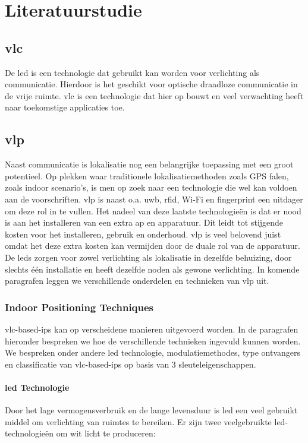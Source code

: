 \chapter{Literatuurstudie}
\section{\acrfull{vlc}}
	De \acrfull{led} is een technologie dat gebruikt kan worden voor verlichting als communicatie. Hierdoor is het geschikt voor optische draadloze communicatie in de vrije ruimte. \gls{vlc} is een technologie dat hier op bouwt en veel verwachting heeft naar toekomstige applicaties toe. 
\section{\acrfull{vlp}}
	Naast communicatie is lokalisatie nog een belangrijke toepassing met een groot potentieel. Op plekken waar traditionele lokalisatiemethoden zoals GPS falen, zoals indoor scenario's, is men op zoek naar een technologie die wel kan voldoen aan de voorschriften. \acrfull{vlp} is naast o.a. \acrfull{uwb}, \acrfull{rfid}, Wi-Fi en fingerprint een uitdager om deze rol in te vullen. Het nadeel van deze laatste technologie\"en is dat er nood is aan het installeren van een extra \acrfull{ap} en apparatuur. Dit leidt tot stijgende kosten voor het installeren, gebruik en onderhoud.
	\gls{vlp} is veel belovend juist omdat het deze extra kosten kan vermijden door de duale rol van de apparatuur. De \glspl{led} zorgen voor zowel verlichting als lokalisatie in dezelfde behuizing, door slechts één installatie en heeft dezelfde noden als gewone verlichting. In komende paragrafen leggen we verschillende onderdelen en technieken van \gls{vlp} uit.
	\subsection{Indoor Positioning Techniques}
	\gls{vlc}-based-\gls{ips} kan op verscheidene manieren uitgevoerd worden. In de paragrafen hieronder bespreken we hoe de verschillende technieken ingevuld kunnen worden. We bespreken onder andere \gls{led} technologie, modulatiemethodes, type ontvangers en classificatie van \gls{vlc}-based-\gls{ips} op basis van 3 sleuteleigenschappen.
	
		\subsubsection{\gls{led} Technologie}
		Door het lage vermogensverbruik en de lange levensduur is \gls{led} een veel gebruikt middel om verlichting van ruimtes te bereiken. Er zijn twee veelgebruikte \gls{led}-technologie\"en om wit licht te produceren: 
		
